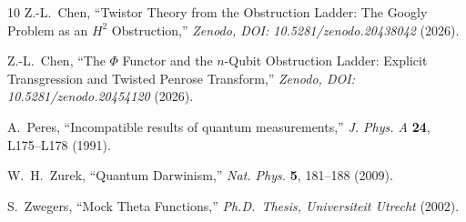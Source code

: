 \documentclass[11pt,a4paper]{article}
\theoremstyle{remark}
\begin{document}
\begin{thebibliography}{10}
Z.-L.~Chen,
``Twistor Theory from the Obstruction Ladder:
The Googly Problem as an $H^2$ Obstruction,''
\textit{Zenodo, DOI: 10.5281/zenodo.20438042} (2026).

Z.-L.~Chen,
``The $\Phi$ Functor and the $n$-Qubit Obstruction Ladder:
Explicit Transgression and Twisted Penrose Transform,''
\textit{Zenodo, DOI: 10.5281/zenodo.20454120} (2026).

A.~Peres,
``Incompatible results of quantum measurements,''
\textit{J. Phys. A} \textbf{24}, L175--L178 (1991).

W.~H.~Zurek,
``Quantum Darwinism,''
\textit{Nat. Phys.} \textbf{5}, 181--188 (2009).

S.~Zwegers,
``Mock Theta Functions,''
\textit{Ph.D.\ Thesis, Universiteit Utrecht} (2002).

\end{thebibliography}
\end{document}
